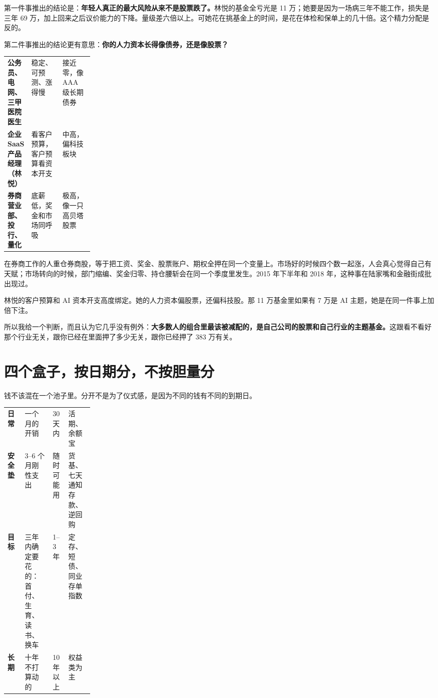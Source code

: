 第一件事推出的结论是：\textbf{年轻人真正的最大风险从来不是股票跌了。}林悦的基金全亏光是 11 万；她要是因为一场病三年不能工作，损失是三年 69 万，加上回来之后议价能力的下降。量级差六倍以上。可她花在挑基金上的时间，是花在体检和保单上的几十倍。这个精力分配是反的。

第二件事推出的结论更有意思：\textbf{你的人力资本长得像债券，还是像股票？}

\begin{tablewrap}
\begin{xltabular}{\linewidth}{>{\raggedright\arraybackslash}p{0.20\linewidth}XX}
\toprule
{} &  &  \\
\midrule
\textbf{公务员、电网、三甲医院医生} & 稳定、可预测、涨得慢 & 接近零，像 AAA 级长期债券 \\
\textbf{企业 SaaS 产品经理（林悦）} & 看客户预算，客户预算看资本开支 & 中高，偏科技板块 \\
\textbf{券商营业部、投行、量化} & 底薪低，奖金和市场同呼吸 & 极高，像一只高贝塔股票 \\
\bottomrule
\end{xltabular}
\end{tablewrap}

在券商工作的人重仓券商股，等于把工资、奖金、股票账户、期权全押在同一个变量上。市场好的时候四个数一起涨，人会真心觉得自己有天赋；市场转向的时候，部门缩编、奖金归零、持仓腰斩会在同一个季度里发生。2015 年下半年和 2018 年，这种事在陆家嘴和金融街成批出现过。

林悦的客户预算和 AI 资本开支高度绑定。她的人力资本偏股票，还偏科技股。那 11 万基金里如果有 7 万是 AI 主题，她是在同一件事上加倍下注。

所以我给一个判断，而且认为它几乎没有例外：\textbf{大多数人的组合里最该被减配的，是自己公司的股票和自己行业的主题基金。}这跟看不看好那个行业无关，跟你已经在里面押了多少无关，跟你已经押了 383 万有关。

\section{四个盒子，按日期分，不按胆量分}

钱不该混在一个池子里。分开不是为了仪式感，是因为不同的钱有不同的到期日。

\begin{tablewrap}
\begin{xltabular}{\linewidth}{>{\raggedright\arraybackslash}p{0.20\linewidth}XXX}
\toprule
{} &  &  &  \\
\midrule
\textbf{日常} & 一个月的开销 & 30 天内 & 活期、余额宝 \\
\textbf{安全垫} & 3–6 个月刚性支出 & 随时可能用 & 货基、七天通知存款、逆回购 \\
\textbf{目标} & 三年内确定要花的：首付、生育、读书、换车 & 1–3 年 & 定存、短债、同业存单指数 \\
\textbf{长期} & 十年不打算动的 & 10 年以上 & 权益类为主 \\
\bottomrule
\end{xltabular}
\end{tablewrap}

